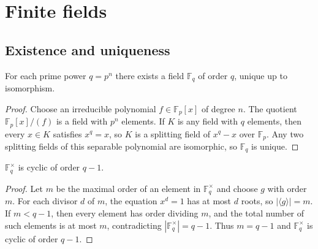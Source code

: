 \section{Finite fields}\label{sec:finite-fields}

\subsection{Existence and uniqueness}
\begin{theorem}
For each prime power $q=p^n$ there exists a field $\mathbb{F}_q$ of order $q$, unique up to isomorphism.
\end{theorem}
\begin{proof}
Choose an irreducible polynomial $f\in\mathbb{F}_p[x]$ of degree $n$.
The quotient $\mathbb{F}_p[x]/(f)$ is a field with $p^n$ elements.
If $K$ is any field with $q$ elements, then every $x\in K$ satisfies
$x^q=x$, so $K$ is a splitting field of $x^q-x$ over $\mathbb{F}_p$.
Any two splitting fields of this separable polynomial are isomorphic,
so $\mathbb{F}_q$ is unique.
\end{proof}
\begin{theorem}
$\mathbb{F}_q^\times$ is cyclic of order $q-1$.
\end{theorem}
\begin{proof}
Let $m$ be the maximal order of an element in $\mathbb{F}_q^\times$ and
choose $g$ with order $m$.
For each divisor $d$ of $m$, the equation $x^d=1$ has at most $d$ roots, so
$|\langle g\rangle|=m$.
If $m<q-1$, then every element has order dividing $m$, and the total
number of such elements is at most $m$, contradicting
$|\mathbb{F}_q^\times|=q-1$.
Thus $m=q-1$ and $\mathbb{F}_q^\times$ is cyclic of order $q-1$.
\end{proof}

